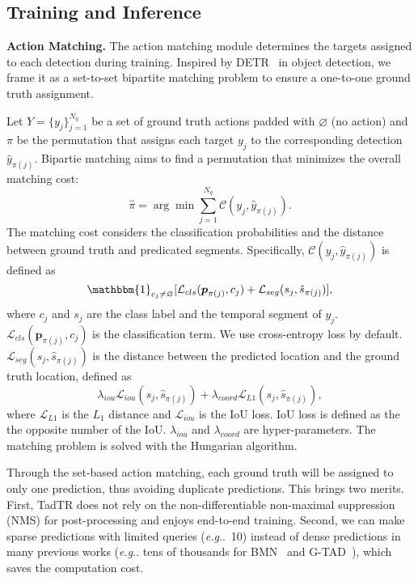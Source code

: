 \documentclass[lettersize,journal]{IEEEtran}
\makeatletter
\DeclareRobustCommand\onedot{\futurelet\@let@token\@onedot}
\def\@onedot{\ifx\@let@token.\else.\null\fi\xspace}
\def\eg{\emph{e.g}\onedot} \def\Eg{\emph{E.g}\onedot}
\makeatother
\begin{document}
\subsection{Training and Inference}
\label{subsec:training}
\noindent\textbf{Action Matching.}
The action matching module determines the targets assigned to each detection during training. Inspired by DETR~\cite{carion2020end} in object detection, we frame it as a set-to-set bipartite matching problem to ensure a one-to-one ground truth assignment. 

Let $Y=\{y_j\}_{j=1}^{N_q}$ be a set of ground truth actions padded with $\varnothing$ (no action) and $\pi$ be the permutation that assigns each target $y_j$ to the corresponding detection $\hat{y}_{\pi(j)}$. Bipartie matching aims to find a permutation that minimizes the overall matching cost:
\begin{equation}
\label{eq:hungarian}
    \hat{\pi}=\arg \min \sum_{j=1}^{N_q} \mathcal{C}(y_j, \hat{y}_{\pi(j)}).
\end{equation}
The matching cost considers the classification probabilities and the distance between ground truth and predicated segments. Specifically, $\mathcal{C}(y_j, \hat{y}_{\pi(j)})$ is defined as
\begin{equation}
\label{eq:matching_cost}
    \mathbbm{1}_{c_j\neq\varnothing}[\mathcal{L}_{cls}(\boldsymbol{p}_{\pi(j)}, c_j)+\mathcal{L}_{seg}(s_j, \hat{s}_{\pi(j)})],
\end{equation}
where $c_j$ and $s_j$ are the class label and the temporal segment of $y_j$. $\mathcal{L}_{cls}(\boldsymbol{p}_{\pi(j)}, c_j)$ is the classification term. We use cross-entropy loss by default. $\mathcal{L}_{seg}(s_j, \hat{s}_{\pi(j)})$ is the distance between the predicted location and the ground truth location, defined as
\begin{equation}
     \lambda_{iou} \mathcal{L}_{iou}(s_j, \hat{s}_{\pi(j)}) + \lambda_{coord} \mathcal{L}_{L1}(s_j, \hat{s}_{\pi(j)}),
\end{equation}
where $\mathcal{L}_{L1}$ is the $L_1$ distance and $\mathcal{L}_{iou}$ is the IoU loss. IoU loss is defined as the the opposite number of the IoU.  $\lambda_{iou}$ and $\lambda_{coord}$ are hyper-parameters. The matching problem is solved with the Hungarian algorithm.

Through the set-based action matching, each ground truth will be assigned to only one prediction, thus avoiding duplicate predictions. This brings two merits. First, TadTR does not rely on the non-differentiable non-maximal suppression (NMS) for post-processing and enjoys end-to-end training. Second, we can make sparse predictions with limited queries (\eg~10) instead of dense predictions in many previous works (\eg tens of thousands for BMN~\cite{lin2019bmn} and G-TAD~\cite{xu2020g}), which saves the computation cost. 
\end{document}
